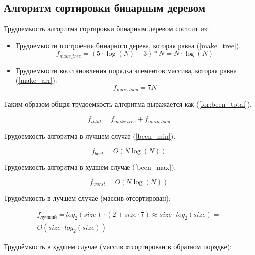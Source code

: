 \subsection{Алгоритм сортировки бинарным деревом}

Трудоемкость алгоритма сортировки бинарным деревом состоит из:

\begin{itemize}
	\item Трудоемкости построения бинарного дерева, которая равна (\ref{make_tree}).
	\begin{equation}
		\label{make_tree}
		f_{make\_tree} = (5 \cdot \log(N) + 3) * N = N \cdot \log(N)
	\end{equation}
	\item Трудоемкости восстановления порядка элементов массива, которая равна (\ref{make_arr}):
	\begin{equation}
		\label{make_arr}
		f_{main\_loop} = 7 N
	\end{equation}
\end{itemize}

Таким образом общая трудоемкость алгоритма выражается как (\ref{for:been_total}).

\begin{equation}
	\label{for:been_total}
	f_{total} = f_{make\_tree} + f_{main\_loop}
\end{equation}

Трудоемкость алгоритма в лучшем случае (\ref{been_min}).

\begin{equation}
	\label{been_min}
	f_{best} = O(N\log(N))
\end{equation}

Трудоемкость алгоритма в худшем случае (\ref{been_max}).

\begin{equation}
	\label{been_max}
	f_{worst} = O(N\log(N))
\end{equation}

Трудоёмкость в лучшем случае (массив отсортирован):

\begin{equation}
	\begin{array}{cc}
		f_{\text{лучший}} = log_2(size) \cdot (2 + size \cdot 7) \approx  size \cdot log_2(size) =\\ O(size \cdot log_2(size))  
	\end{array}
\end{equation}
\pagebreak

Трудоёмкость в худшем случае (массив отсортирован в обратном порядке):

